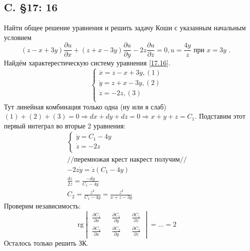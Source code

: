 \documentclass{article}
\newcommand{\rg}{\text{rg}}
\begin{document}
\subsection{C. \S17: 16}
Найти общее решение уравнения и решить задачу Коши с указанным
начальным условием
\begin{equation}\label{17.16}
(z-x+3 y) \frac{\partial u}{\partial x}+(z+x-3 y) \frac{\partial u}{\partial y}-2 z \frac{\partial u}{\partial z}=0, u=\frac{4 y}{z} \text { при } x=3 y \text { . }
\end{equation}
\textcolor[rgb]{1,1,1}{                                            }
Найдём характерестическую систему уравнения \ref{17.16}.
\begin{equation*}
    \begin{cases}
        \dot x = z-x+3y, (1)\\
        \dot y = z+x-3y, (2)\\
        \dot z = -2z,(3)\\
    \end{cases}
\end{equation*}
Тут линейная комбинация только одна (ну или я слаб) $(1) + (2) + (3)=0 \Rightarrow dx+dy+dz=0 \Rightarrow x+y+z = C_1$. Подставим этот первый интеграл во вторые 2 уравнения:
\begin{gather*}
    \begin{cases}
        \dot y = C_1-4y\\
        \dot z =-2z\\
    \end{cases}\\
//\text{перемножая крест накрест получим}//\\
-2z \dot y = \dot z(C_1-4y)\\
\frac{dz}{2z}=\frac{-dy}{C_1-4y}\\
C_2=\frac{z^2}{C_1-4y}= \frac{z^2}{x+z-3y}
\end{gather*}
Проверим независимость: 
\begin{equation*}
    \rg \begin{vmatrix}
        \frac{\partial C_1}{\partial x} && \frac{\partial C_1}{\partial y} && \frac{\partial C_1}{\partial z}\\
        \frac{\partial C_2}{\partial x} && \frac{\partial C_2}{\partial y} && \frac{\partial C_2}{\partial z}
    \end{vmatrix} = ... = 2
\end{equation*}
Осталось только решить ЗК.
\end{document}
